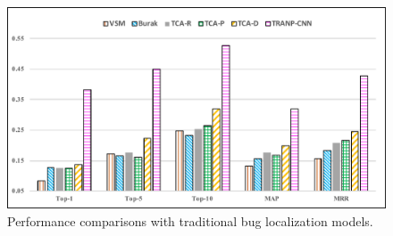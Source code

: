 \begin{figure}[hbt]
\centering
\includegraphics[width = 0.9\columnwidth]{pic/results3.pdf}
\caption{Performance comparisons with traditional bug localization models.}
\label{fig:results3}
\end{figure}

